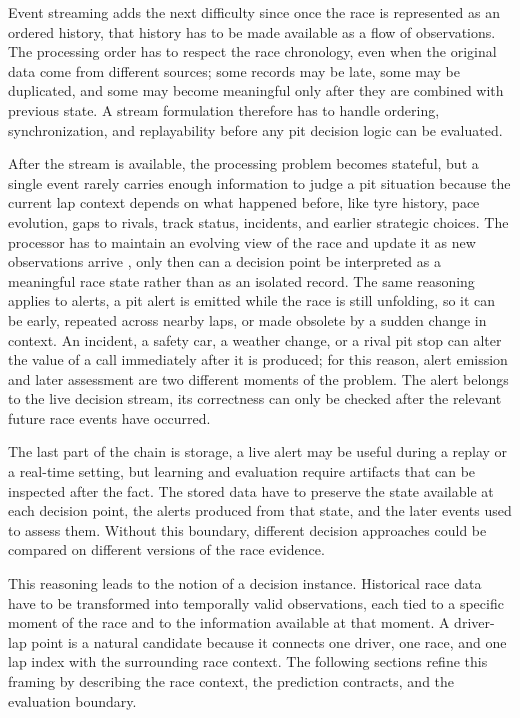 Event streaming adds the next difficulty since
once the race is represented as an ordered history, that history has to be made available as a flow of observations.
The processing order has to respect the race chronology, even when the original data come from different sources;
some records may be late, some may be duplicated, and some may become meaningful only after they are combined with previous state.
A stream formulation therefore has to handle ordering, synchronization, and replayability before any pit decision logic can be evaluated.
\citep{akidau2015dataflow,carbone2015flink,kreps2011kafka}

After the stream is available, the processing problem becomes stateful, but a single event rarely carries enough information to judge a pit situation because
the current lap context depends on what happened before, like tyre history, pace evolution, gaps to rivals, track status, incidents, and earlier strategic choices.
The processor has to maintain an evolving view of the race and update it as new observations arrive \citep{carbone2015flink,akidau2015dataflow},
only then can a decision point be interpreted as a meaningful race state rather than as an isolated record.
The same reasoning applies to alerts, a pit alert is emitted while the race is still unfolding, so it can be early, repeated across nearby laps,
or made obsolete by a sudden change in context.
An incident, a safety car, a weather change, or a rival pit stop can alter the value of a call immediately after it is produced;
for this reason, alert emission and later assessment are two different moments of the problem.
The alert belongs to the live decision stream, its correctness can only be checked after the relevant future race events have occurred.

The last part of the chain is storage,
a live alert may be useful during a replay or a real-time setting, but learning and evaluation require artifacts that can be inspected after the fact.
The stored data have to preserve the state available at each decision point, the alerts produced from that state, and the later events used to assess them.
Without this boundary, different decision approaches could be compared on different versions of the race evidence.
\citep{roberts2017cvstructured,brookshire2024leakage}

This reasoning leads to the notion of a decision instance.
Historical race data have to be transformed into temporally valid observations, each tied to a specific moment of the race and to the information available at that moment.
A driver-lap point is a natural candidate because it connects one driver, one race, and one lap index with the surrounding race context.
The following sections refine this framing by describing the race context, the prediction contracts, and the evaluation boundary.

